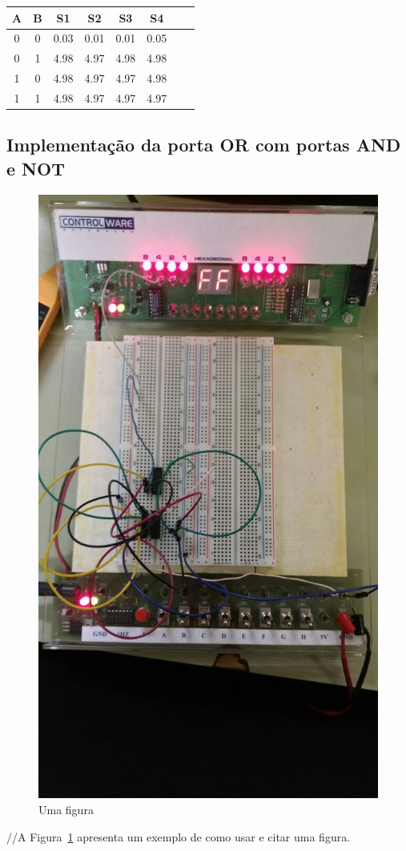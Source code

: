 \documentclass[12pt]{article}
\begin{document}
\begin{table}[H]
	\centering
	\begin{tabular}{|c|c|c|c|c|c|c|c|}
	\cline{1-6}
	\multicolumn{1}{|c|}{A} & \multicolumn{1}{|c|}{B} & \multicolumn{1}{|c|}{S1} & \multicolumn{1}{|c|}{S2} & \multicolumn{1}{|c|}{S3} & \multicolumn{1}{|c|}{S4}\\
	\hline
	0 & 0 & 0.03 & 0.01 & 0.01 & 0.05\\
	0 & 1 & 4.98 & 4.97 & 4.98 & 4.98\\
	1 & 0 & 4.98 & 4.97 & 4.97 & 4.98\\
	1 & 1 & 4.98 & 4.97 & 4.97 & 4.97\\
	\hline
	\end{tabular}
	\label{Porta OR}
\end{table}


\subsection{Implementação da porta OR com portas AND e NOT}
\label{sec:NOTAND}

\begin{figure}[H]
\centering
\includegraphics[width=.5\textwidth]{Porta_OR.jpeg}
\caption{Uma figura}
\label{fig:portaor}
\end{figure}

//A Figura~\ref{fig:portaor} apresenta um exemplo de como usar e citar uma figura.
\end{document}
